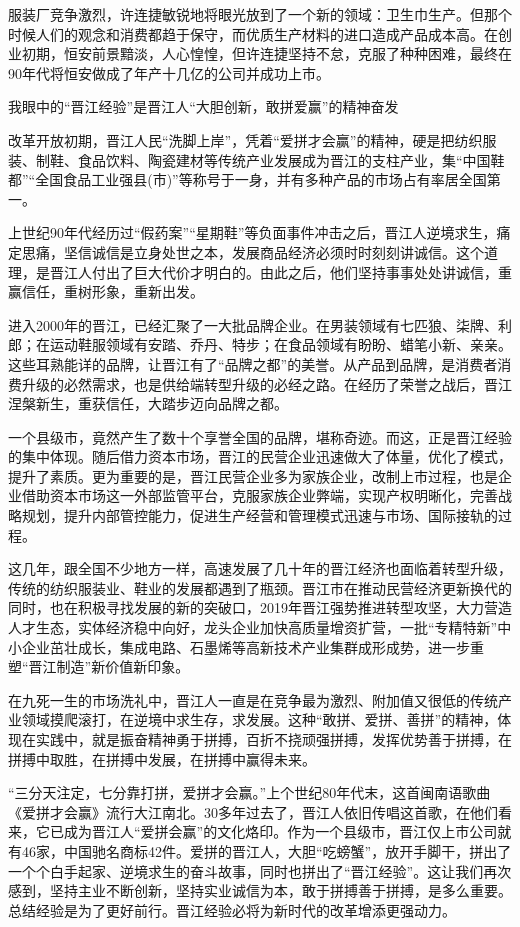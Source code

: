 \documentclass[]{book}
\begin{document}
服装厂竞争激烈，许连捷敏锐地将眼光放到了一个新的领域：卫生巾生产。但那个时候人们的观念和消费都趋于保守，而优质生产材料的进口造成产品成本高。在创业初期，恒安前景黯淡，人心惶惶，但许连捷坚持不怠，克服了种种困难，最终在90年代将恒安做成了年产十几亿的公司并成功上市。

我眼中的``晋江经验''是晋江人``大胆创新，敢拼爱赢''的精神奋发

改革开放初期，晋江人民``洗脚上岸''，凭着``爱拼才会赢''的精神，硬是把纺织服装、制鞋、食品饮料、陶瓷建材等传统产业发展成为晋江的支柱产业，集``中国鞋都''``全国食品工业强县(市)''等称号于一身，并有多种产品的市场占有率居全国第一。

上世纪90年代经历过``假药案''``星期鞋''等负面事件冲击之后，晋江人逆境求生，痛定思痛，坚信诚信是立身处世之本，发展商品经济必须时时刻刻讲诚信。这个道理，是晋江人付出了巨大代价才明白的。由此之后，他们坚持事事处处讲诚信，重赢信任，重树形象，重新出发。

进入2000年的晋江，已经汇聚了一大批品牌企业。在男装领域有七匹狼、柒牌、利郎；在运动鞋服领域有安踏、乔丹、特步；在食品领域有盼盼、蜡笔小新、亲亲。这些耳熟能详的品牌，让晋江有了``品牌之都''的美誉。从产品到品牌，是消费者消费升级的必然需求，也是供给端转型升级的必经之路。在经历了荣誉之战后，晋江涅槃新生，重获信任，大踏步迈向品牌之都。

一个县级市，竟然产生了数十个享誉全国的品牌，堪称奇迹。而这，正是晋江经验的集中体现。随后借力资本市场，晋江的民营企业迅速做大了体量，优化了模式，提升了素质。更为重要的是，晋江民营企业多为家族企业，改制上市过程，也是企业借助资本市场这一外部监管平台，克服家族企业弊端，实现产权明晰化，完善战略规划，提升内部管控能力，促进生产经营和管理模式迅速与市场、国际接轨的过程。

这几年，跟全国不少地方一样，高速发展了几十年的晋江经济也面临着转型升级，传统的纺织服装业、鞋业的发展都遇到了瓶颈。晋江市在推动民营经济更新换代的同时，也在积极寻找发展的新的突破口，2019年晋江强势推进转型攻坚，大力营造人才生态，实体经济稳中向好，龙头企业加快高质量增资扩营，一批``专精特新''中小企业茁壮成长，集成电路、石墨烯等高新技术产业集群成形成势，进一步重塑``晋江制造''新价值新印象。

在九死一生的市场洗礼中，晋江人一直是在竞争最为激烈、附加值又很低的传统产业领域摸爬滚打，在逆境中求生存，求发展。这种``敢拼、爱拼、善拼''的精神，体现在实践中，就是振奋精神勇于拼搏，百折不挠顽强拼搏，发挥优势善于拼搏，在拼搏中取胜，在拼搏中发展，在拼搏中赢得未来。

``三分天注定，七分靠打拼，爱拼才会赢。''上个世纪80年代末，这首闽南语歌曲《爱拼才会赢》流行大江南北。30多年过去了，晋江人依旧传唱这首歌，在他们看来，它已成为晋江人``爱拼会赢''的文化烙印。作为一个县级市，晋江仅上市公司就有46家，中国驰名商标42件。爱拼的晋江人，大胆``吃螃蟹''，放开手脚干，拼出了一个个白手起家、逆境求生的奋斗故事，同时也拼出了``晋江经验''。这让我们再次感到，坚持主业不断创新，坚持实业诚信为本，敢于拼搏善于拼搏，是多么重要。总结经验是为了更好前行。晋江经验必将为新时代的改革增添更强动力。
\end{document}
